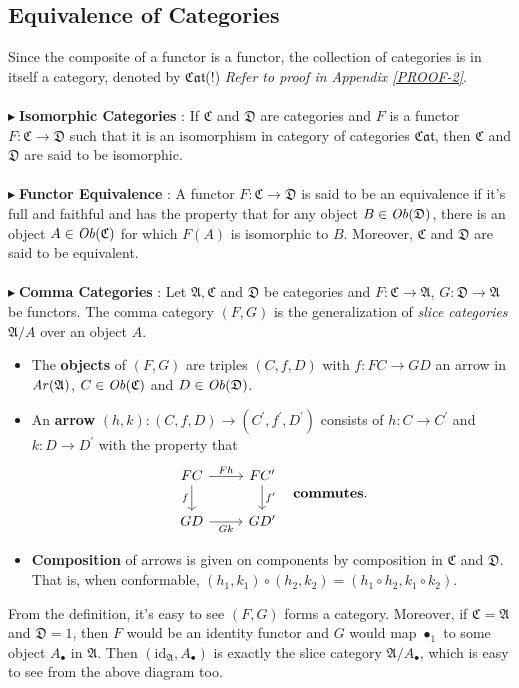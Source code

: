 \documentclass{article}
\theoremstyle{definition}
\theoremstyle{remark}
\theoremstyle{definition}
\theoremstyle{definition}
\theoremstyle{definition}
\newcommand{\proofref}[1]{\emph{Refer to proof in Appendix #1}}
\newcommand{\cat}[1]{\mathfrak{#1}}
\newcommand{\obj}[1]{\text{\textit{Ob}}(#1)}
\newcommand{\arr}[1]{\text{\textit{Ar}}(#1)}
\newcommand{\Id}[1]{\text{id}_{#1}}
\newcommand{\point}[0]{$\blacktriangleright\;$}
\newcommand{\singobj}[1]{\bullet_{#1}}
\begin{document}
\subsection{Equivalence of Categories}
Since the composite of a functor is a functor, the collection of categories is in itself a category, denoted by $ \cat{Cat} $(!) \proofref{\ref{PROOF-2}}.\\\\
\point \textbf{Isomorphic Categories} : If $ \cat{C} $ and $ \cat{D} $ are categories and $ F $ is a functor $ F : \cat{C} \to \cat{D} $ such that it is an isomorphism in category of categories $ \cat{Cat} $, then $ \cat{C}$ and $ \cat{D} $ are said to be isomorphic.\\\\
\point \textbf{Functor Equivalence} : A functor $ F : \cat{C} \longrightarrow \cat{D} $ is said to be an equivalence if it's full and faithful and has the property that for any object $ B \in \obj{\cat{D}}$, there is an object $ A\in \obj{\cat{C}} $ for which $ F(A) $ is isomorphic to $ B $. Moreover, $ \cat{C} $ and $ \cat{D} $ are said to be equivalent.\\\\
\point \textbf{Comma Categories} : Let $ \cat{A},\cat{C} $ and $ \cat{D} $ be categories and $ F : \cat{C} \to \cat{A} $, $ G:\cat{D} \to \cat{A}$ be functors. The comma category $ (F,G) $ is the generalization of \emph{slice categories} $ \cat{A}/ A $ over an object $ A $. 
\begin{itemize}
	\item {The \textbf{objects} of $ (F,G) $ are triples $ (C,f,D) $ with $ f: FC \to GD$ an arrow in $ \arr{\cat{A}} $, $ C \in \obj{\cat{C}} $  and $ D\in \obj{\cat{D}} $.}
	\item {An \textbf{arrow} $ (h,k): (C,f,D) \longrightarrow (C^{\prime},f^{\prime},D^{\prime}) $ consists of $ h:C\to C^{\prime} $ and $ k:D\to D^{\prime} $ with the property that 
\[\begin{tikzcd}
	FC\arrow{r}{Fh} \arrow[swap]{d}{f} &FC^{\prime} \arrow{d}{f^{\prime}}\\
	GD\arrow[swap]{r}{Gk} &GD^{\prime}
\end{tikzcd} \;\;\;\text{\textbf{commutes}.}\]	
}
\item {\textbf{Composition} of arrows is given on components by composition in $ \cat{C} $ and $ \cat{D} $. That is, when conformable, $ (h_1,k_1)\circ (h_2,k_2) = (h_1\circ h_2,k_1\circ k_2) $.}
\end{itemize}
From the definition, it's easy to see $ (F,G) $ forms a category. Moreover, if $ \cat{C} = \cat{A} $ and $ \cat{D} = \cat{1} $, then $ F $ would be an identity functor and $ G $ would map $ \singobj{\cat{1}} $ to some object $ A_\bullet $ in $ \cat{A} $. Then $ (\Id{\cat{A}},A_\bullet) $ is exactly the slice category $ \cat{A}/A_\bullet $, which is easy to see from the above diagram too.\\\\
\end{document}
